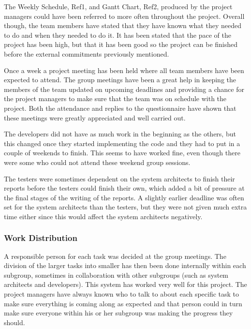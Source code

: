 \documentclass[a4paper]{article}
\begin{document}
The Weekly Schedule, Ref1, and Gantt Chart, Ref2, produced by the project managers could have been referred to more often throughout the project. Overall though, the team members have stated that they have known what they needed to do and when they needed to do it. It has been stated that the pace of the project has been high, but that it has been good so the project can be finished before the external commitments previously mentioned. 

Once a week a project meeting has been held where all team members have been expected to attend. The group meetings have been a great help in keeping the members of the team updated on upcoming deadlines and providing a chance for the project managers to make sure that the team was on schedule with the project. Both the attendance and replies to the questionnaire have shown that these meetings were greatly appreciated and well carried out.

The developers did not have as much work in the beginning as the others, but this changed once they started implementing the code and they had to put in a couple of weekends to finish. This seems to have worked fine, even though there were some who could not attend these weekend group sessions.

The testers were sometimes dependent on the system architects to finish their reports before the testers could finish their own, which added a bit of pressure at the final stages of the writing of the reports. A slightly earlier deadline was often set for the system architects than the testers, but they were not given much extra time either since this would affect the system architects negatively.



\subsubsection{Work Distribution}

A responsible person for each task was decided at the group meetings. The division of the larger tasks into smaller has then been done internally within each subgroup, sometimes in collaboration with other subgroups (such as system architects and developers). This system has worked very well for this project. The project managers have always known who to talk to about each specific task to make sure everything is coming along as expected and that person could in turn make sure everyone within his or her subgroup was making the progress they should. 
\end{document}

